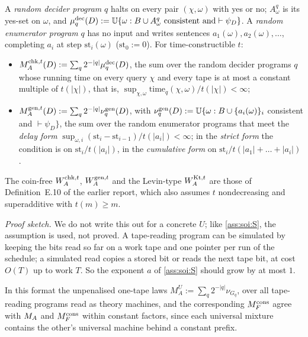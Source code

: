 \begin{definition}\label{def:soi:penalised}
A \emph{random decider program} $q$ halts on every pair $(\chi,\omega)$ with yes or no; $A^q_\omega$ is its yes-set on $\omega$, and $\mu^{\mathrm{dec}}_q(D):=\mathbb{U}\{\omega:B\cup A^q_\omega\text{ consistent and}\vdash\psi_D\}$. A \emph{random enumerator program} $q$ has no input and writes sentences $a_1(\omega),a_2(\omega),\dots$, completing $a_i$ at step $\mathrm{st}_i(\omega)$ ($\mathrm{st}_0:=0$). For time-constructible $t$:
\begin{itemize}[leftmargin=*]
\item $M_{A}^{\mathrm{chk},t}(D):=\sum_q2^{-\lvert q\rvert}\mu^{\mathrm{dec}}_q(D)$, the sum over the random decider programs $q$ whose running time on every query $\chi$ and every tape is at most a constant multiple of $t(\lvert\chi\rvert)$, that is, $\sup_{\chi,\omega}\mathrm{time}_q(\chi,\omega)/t(\lvert\chi\rvert)<\infty$;
\item $M_{A}^{\mathrm{gen},t}(D):=\sum_q2^{-\lvert q\rvert}\nu^{\mathrm{gen}}_q(D)$, with $\nu^{\mathrm{gen}}_q(D):=\mathbb{U}\{\omega:B\cup\{a_i(\omega)\}_i$ consistent and $\vdash\psi_D\}$, the sum over the random enumerator programs that meet the \emph{delay form} $\sup_{\omega,i}(\mathrm{st}_i-\mathrm{st}_{i-1})/t(\lvert a_i\rvert)<\infty$; in the \emph{strict form} the condition is on $\mathrm{st}_i/t(\lvert a_i\rvert)$, in the \emph{cumulative form} on $\mathrm{st}_i/t(\lvert a_1\rvert+\dots+\lvert a_i\rvert)$.
\end{itemize}
The coin-free $W_{A}^{\mathrm{chk},t}$, $W_{A}^{\mathrm{gen},t}$ and the Levin-type $W_{A}^{\mathrm{Kt},t}$ are those of Definition~E.10 of the earlier report, which also assumes $t$ nondecreasing and superadditive with $t(m)\ge m$.
\end{definition}

\begin{remark}
\emph{Proof sketch.} We do not write this out for a concrete $U$; like \cref{ass:soi:S}, the assumption is used, not proved. A tape-reading program can be simulated by keeping the bits read so far on a work tape and one pointer per run of the schedule; a simulated read copies a stored bit or reads the next tape bit, at cost $O(T)$ up to work $T$. So the exponent $a$ of \cref{ass:soi:S} should grow by at most $1$.
\end{remark}

In this format the unpenalised one-tape laws $M_A^U:=\sum_q2^{-\lvert q\rvert}\nu_{G_q}$, over all tape-reading programs read as theory machines, and the corresponding $M_{F}^{\mathrm{cons}}$ agree with $M_{A}$ and $M_{F}^{\mathrm{cons}}$ within constant factors, since each universal mixture contains the other's universal machine behind a constant prefix.

